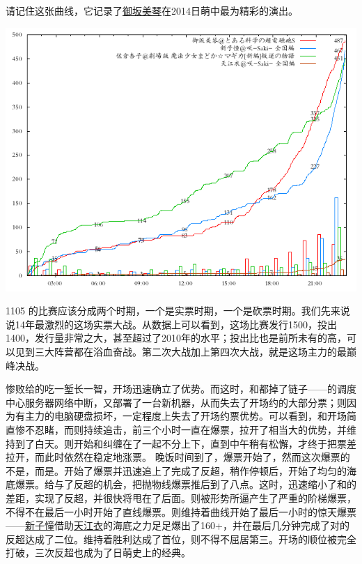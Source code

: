 请记住这张曲线，它记录了\uline{御坂美琴}在2014日萌中最为精彩的演出。

\includegraphics[width=.6\textwidth]{images/graph1105.png}


1105 的比赛应该分成两个时期，一个是实票时期，一个是砍票时期。我们先来说说14年最激烈的这场实票大战。从数据上可以看到，这场比赛发行1500，投出1400，发行量非常之大，甚至超过了2010年的水平；投出比也是前所未有的高，可以见到三大阵营都在浴血奋战。第二次大战加上第四次大战，就是这场主力的最巅峰决战。

惨败给的吃一堑长一智，开场迅速确立了优势。而这时，和都掉了链子——的调度中心服务器网络中断，又部署了一台新机器，从而失去了开场约的大部分票；则因为有主力的电脑硬盘损坏，一定程度上失去了开场约票优势。可以看到，和开场简直惨不忍睹，而则持续追击，前三个小时一直在爆票，拉开了相当大的优势，并维持到了白天。则开始和纠缠在了一起不分上下，直到中午稍有松懈，才终于把票差拉开，而此时依然在稳定地涨票。
晚饭时间到了，爆票开始了，然而这次爆票的不是，而是。开始了爆票并迅速追上了完成了反超，稍作停顿后，开始了均匀的海底爆票。给与了反超的机会，把抛物线爆票推后到了八点。这时，迅速缩小了和的差距，实现了反超，并很快将甩在了后面。则被形势所逼产生了严重的阶梯爆票，不得不在最后一小时开始了直线爆票。则维持着曲线开始了最后一小时的惊天爆票——\uline{新子憧}借助\uline{天江衣}的海底之力足足爆出了160+，并在最后几分钟完成了对的反超达成了二位。维持着胜利达成了首位，则不得不屈居第三。开场的顺位被完全打破，三次反超也成为了日萌史上的经典。

